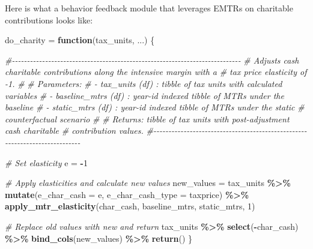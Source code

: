 \documentclass[
]{article}
\newenvironment{Shaded}{\begin{snugshade}}{\end{snugshade}}
\newcommand{\AttributeTok}[1]{\textcolor[rgb]{0.13,0.29,0.53}{#1}}
\newcommand{\CommentTok}[1]{\textcolor[rgb]{0.56,0.35,0.01}{\textit{#1}}}
\newcommand{\ControlFlowTok}[1]{\textcolor[rgb]{0.13,0.29,0.53}{\textbf{#1}}}
\newcommand{\DecValTok}[1]{\textcolor[rgb]{0.00,0.00,0.81}{#1}}
\newcommand{\FunctionTok}[1]{\textcolor[rgb]{0.13,0.29,0.53}{\textbf{#1}}}
\newcommand{\NormalTok}[1]{#1}
\newcommand{\OtherTok}[1]{\textcolor[rgb]{0.56,0.35,0.01}{#1}}
\newcommand{\SpecialCharTok}[1]{\textcolor[rgb]{0.81,0.36,0.00}{\textbf{#1}}}
\newcommand{\StringTok}[1]{\textcolor[rgb]{0.31,0.60,0.02}{#1}}
\begin{document}
Here is what a behavior feedback module that leverages EMTRs on
charitable contributions looks like:

\begin{Shaded}
\begin{Highlighting}[]
\NormalTok{do\_charity }\OtherTok{=} \ControlFlowTok{function}\NormalTok{(tax\_units, ...) \{ }
  
  \CommentTok{\#{-}{-}{-}{-}{-}{-}{-}{-}{-}{-}{-}{-}{-}{-}{-}{-}{-}{-}{-}{-}{-}{-}{-}{-}{-}{-}{-}{-}{-}{-}{-}{-}{-}{-}{-}{-}{-}{-}{-}{-}{-}{-}{-}{-}{-}{-}{-}{-}{-}{-}{-}{-}{-}{-}{-}{-}{-}{-}{-}{-}{-}{-}{-}{-}{-}{-}{-}{-}{-}{-}{-}{-}{-}{-}{-}{-}}
  \CommentTok{\# Adjusts cash charitable contributions along the intensive margin with a }
  \CommentTok{\# tax price elasticity of {-}1.}
  \CommentTok{\# }
  \CommentTok{\# Parameters: }
  \CommentTok{\#   {-} tax\_units (df)     : tibble of tax units with calculated variables}
  \CommentTok{\#   {-} baseline\_mtrs (df) : year{-}id indexed tibble of MTRs under the baseline}
  \CommentTok{\#   {-} static\_mtrs (df)   : year{-}id indexed tibble of MTRs under the static}
  \CommentTok{\#                          counterfactual scenario}
  \CommentTok{\#}
  \CommentTok{\# Returns: tibble of tax units with post{-}adjustment cash charitable }
  \CommentTok{\#          contribution values. }
  \CommentTok{\#{-}{-}{-}{-}{-}{-}{-}{-}{-}{-}{-}{-}{-}{-}{-}{-}{-}{-}{-}{-}{-}{-}{-}{-}{-}{-}{-}{-}{-}{-}{-}{-}{-}{-}{-}{-}{-}{-}{-}{-}{-}{-}{-}{-}{-}{-}{-}{-}{-}{-}{-}{-}{-}{-}{-}{-}{-}{-}{-}{-}{-}{-}{-}{-}{-}{-}{-}{-}{-}{-}{-}{-}{-}{-}{-}{-}}
  
  \CommentTok{\# Set elasticity}
\NormalTok{  e }\OtherTok{=} \SpecialCharTok{{-}}\DecValTok{1}
  
  \CommentTok{\# Apply elasticities and calculate new values}
\NormalTok{  new\_values }\OtherTok{=}\NormalTok{ tax\_units }\SpecialCharTok{\%\textgreater{}\%} 
    \FunctionTok{mutate}\NormalTok{(}\AttributeTok{e\_char\_cash      =}\NormalTok{ e, }
           \AttributeTok{e\_char\_cash\_type =} \StringTok{\textquotesingle{}taxprice\textquotesingle{}}\NormalTok{) }\SpecialCharTok{\%\textgreater{}\%} 
    \FunctionTok{apply\_mtr\_elasticity}\NormalTok{(}\StringTok{\textquotesingle{}char\_cash\textquotesingle{}}\NormalTok{, baseline\_mtrs, static\_mtrs, }\DecValTok{1}\NormalTok{)}

  \CommentTok{\# Replace old values with new and return}
\NormalTok{  tax\_units }\SpecialCharTok{\%\textgreater{}\%} 
    \FunctionTok{select}\NormalTok{(}\SpecialCharTok{{-}}\NormalTok{char\_cash) }\SpecialCharTok{\%\textgreater{}\%} 
    \FunctionTok{bind\_cols}\NormalTok{(new\_values) }\SpecialCharTok{\%\textgreater{}\%} 
    \FunctionTok{return}\NormalTok{()}
\NormalTok{\}}
\end{Highlighting}
\end{Shaded}
\end{document}
